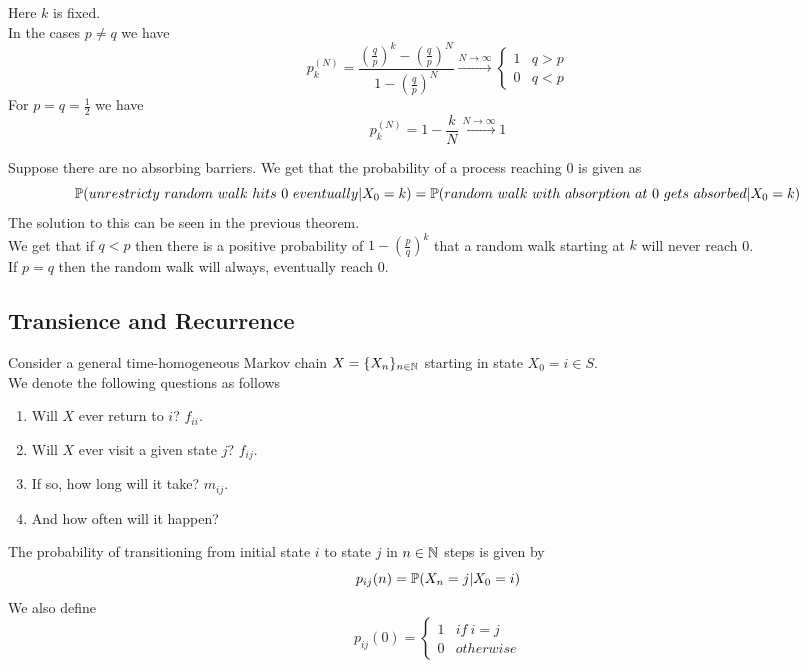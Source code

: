 \documentclass[11pt,a4paper]{article}
\begin{document}
\proof{}%
Here $k$ is fixed.\\
In the cases $p\neq q$ we have
$$p_k^{(N)}=\dfrac{(\frac{q}{p})^k-(\frac{q}{p})^N}{1-(\frac{q}{p})^N}\xrightarrow{N\to\infty}\begin{cases} 1& q>p\\ 0& q<p\end{cases}$$
For $p=q=\frac{1}{2}$ we have
$$p_k^{(N)}=1-\frac{k}{N}\xrightarrow{N\to\infty}1$$

Suppose there are no absorbing barriers. We get that the probability of a process reaching 0 is given as $$\prob(unrestricty\ random\ walk\ hits\ 0\ eventually|X_0=k)=\prob(random\ walk\ with\ absorption\ at\ 0\ gets\ absorbed|X_0=k)$$
The solution to this can be seen in the previous theorem.\\
We get that if $q<p$ then there is a positive probability of $1-(\frac{p}{q})^k$ that a random walk starting at $k$ will never reach 0.\\
If $p=q$ then the random walk will always, eventually reach $0$.\\

\subsection{Transience and Recurrence}

\notation{}
Consider a general time-homogeneous Markov chain $X=\{X_n\}_{n\in\mathbb{N}}$ starting in state $X_0=i\in S$.\\
We denote the following questions as follows
\begin{enumerate}[label=\roman*)]
	\item Will $X$ ever return to $i$? $f_{ii}$.
	\item Will $X$ ever visit a given state $j$? $f_{ij}$.
	\item If so, how long will it take? $m_{ij}$.
	\item And how often will it happen? %
\end{enumerate}

The probability of transitioning from initial state $i$ to state $j$ in $n\in\mathbb{N}$ steps is given by
$$p_{ij}(n)=\mathbb{P}(X_n=j|X_0=i)$$
We also define
$$p_{ij}(0)=\begin{cases}1&if\ i=j\\0&otherwise\end{cases}$$
\end{document}
